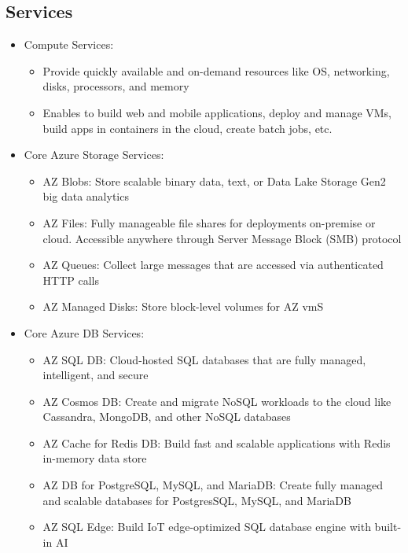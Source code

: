 \documentclass[11pt]{scrartcl}
\begin{document}
\subsection*{Services}
\begin{itemize}
	\item Compute Services:
	\begin{itemize}
		\item Provide quickly available and on-demand resources like OS, networking, disks, processors, and memory
		\item Enables to build web and mobile applications, deploy and manage VMs, build apps in containers in the cloud, create batch jobs, etc.
	\end{itemize}
	\item Core Azure Storage Services:
	\begin{itemize}
		\item AZ Blobs: Store scalable binary data, text, or Data Lake Storage Gen2 big data analytics
		\item AZ Files: Fully manageable file shares for deployments on-premise or cloud. Accessible anywhere through Server Message Block (SMB) protocol
		\item AZ Queues: Collect large messages that are accessed via authenticated HTTP calls
		\item AZ Managed Disks: Store block-level volumes for AZ vmS
	\end{itemize}
	\item Core Azure DB Services:
	\begin{itemize}
		\item AZ SQL DB: Cloud-hosted SQL databases that are fully managed, intelligent, and secure
		\item AZ Cosmos DB: Create and migrate NoSQL workloads to the cloud like Cassandra, MongoDB, and
		other NoSQL databases
		\item AZ Cache for Redis DB: Build fast and scalable applications with Redis in-memory data store
		\item AZ DB for PostgreSQL, MySQL, and MariaDB: Create fully managed and scalable databases for PostgresSQL, MySQL, and MariaDB
		\item AZ SQL Edge: Build IoT edge-optimized SQL database engine with built-in AI
	\end{itemize}
\end{itemize}
\end{document}
